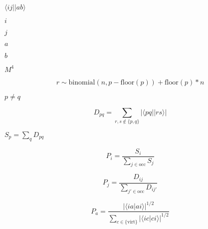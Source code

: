 \documentclass{article}
\begin{document}
$ \langle i j || a b \rangle $
\pagebreak

$ i $
\pagebreak

$ j $
\pagebreak

$ a $
\pagebreak

$ b $
\pagebreak

$ M^4 $
\pagebreak

\[ r \sim \text{binomial}(n, p - \text{floor}(p)) + \text{floor}(p) * n \]
\pagebreak

$ p \neq q $
\pagebreak

\[ D_{pq} = \sum_{r,s \notin \lbrace p, q \rbrace} \left\lvert \langle p q || r s \rangle \right\rvert \]
\pagebreak

$ S_p = \sum_{q} D_{pq} $
\pagebreak

\[ P_i = \frac{S_i}{\sum_{j \in \text{occ}} S_j} \]
\pagebreak

\[ P_j = \frac{D_{ij}}{\sum_{j' \in \text{occ}} D_{ij'}} \]
\pagebreak

\[ P_a = \frac{|\langle i a | a i \rangle|^{1/2}}{\sum_{c \in \lbrace \text{virt} \rbrace} |\langle i c | c i \rangle|^{1/2}} \]
\pagebreak
\end{document}

